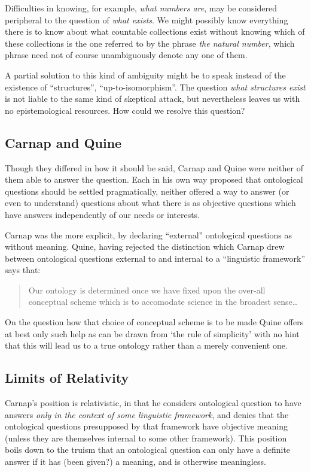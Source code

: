 \documentclass{rbjk}
\begin{document}
\begin{article}
Difficulties in knowing, for example, {\it what numbers are}, may be considered peripheral to the question of {\it what exists}.
We might possibly know everything there is to know about what countable collections exist without knowing which of these collections is the one referred to by the phrase {\it the natural number}, which phrase need not of course unambiguously denote any one of them.

A partial solution to this kind of ambiguity might be to speak instead of the existence of ``structures'', ``up-to-isomorphism''.
The question {\it what structures exist} is not liable to the same kind of skeptical attack, but nevertheless leaves us with no epistemological resources.
How could we resolve this question?

\subsection{Carnap and Quine}

Though they differed in how it should be said, Carnap \cite{Carnap50} and Quine \cite{Quine51} \cite{Quine53} were neither of them able to answer the question.
Each in his own way proposed that ontological questions should be settled pragmatically, neither offered a way to answer (or even to understand) questions about what there is as objective questions which have answers independently of our needs or interests.

Carnap was the more explicit, by declaring ``external'' ontological questions as without meaning.
Quine, having rejected the distinction which Carnap drew between ontological questions external to and internal to a ``linguistic framework'' says that:
\begin{quote}
Our ontology is determined once we have fixed upon the over-all conceptual scheme which is to accomodate science in the broadest sense\ldots
\end{quote}
On the question how that choice of conceptual scheme is to be made Quine offers at best only such help as can be drawn from `the rule of simplicity' with no hint that this will lead us to a true ontology rather than a merely convenient one.

\subsection{Limits of Relativity}

Carnap's position is relativistic, in that he considers ontological question to have answers {\it only in the context of some linguistic framework}, and denies that the ontological questions presupposed by that framework have objective meaning (unless they are themselves internal to some other framework).
This position boils down to the truism that an ontological question can only have a definite answer if it has (been given?) a meaning, and is otherwise meaningless.


\end{article}
\end{document}
